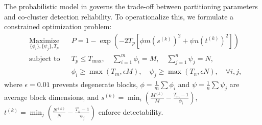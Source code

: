 \documentclass[journal]{IEEEtran}
\begin{document}
The probabilistic model in  governs the trade-off between partitioning parameters and co-cluster detection reliability. To operationalize this, we formulate a constrained optimization problem:
\begin{equation}
    \begin{aligned}
         & \underset{\{\phi_i\}, \{\psi_j\}, T_p}{\text{Maximize}}
         &                                                         & P = 1 - \exp\left( -2 T_p \left[ \phi m (s^{(k)})^2 + \psi n (t^{(k)})^2 \right] \right)                                                                                                  \\
         & \text{subject to}
         &                                                         & T_p \leq T_{\text{max}}, \quad \sum_{i=1}^m \phi_i = M, \quad \sum_{j=1}^n \psi_j = N,                                                                                                    \\
         &                                                         &                                                                                          & \phi_i \geq \max(T_m, \epsilon M), \quad \psi_j \geq \max(T_n, \epsilon N), \quad \forall i,j,
    \end{aligned}
\end{equation}
where $\epsilon = 0.01$ prevents degenerate blocks, $\phi = \frac{1}{m}\sum \phi_i$ and $\psi = \frac{1}{n}\sum \psi_j$ are average block dimensions, and $s^{(k)} = \min_i \left( \frac{M^{(k)}}{M} - \frac{T_m-1}{\phi_i} \right)$, $t^{(k)} = \min_j \left( \frac{N^{(k)}}{N} - \frac{T_n-1}{\psi_j} \right)$ enforce detectability.
\end{document}
